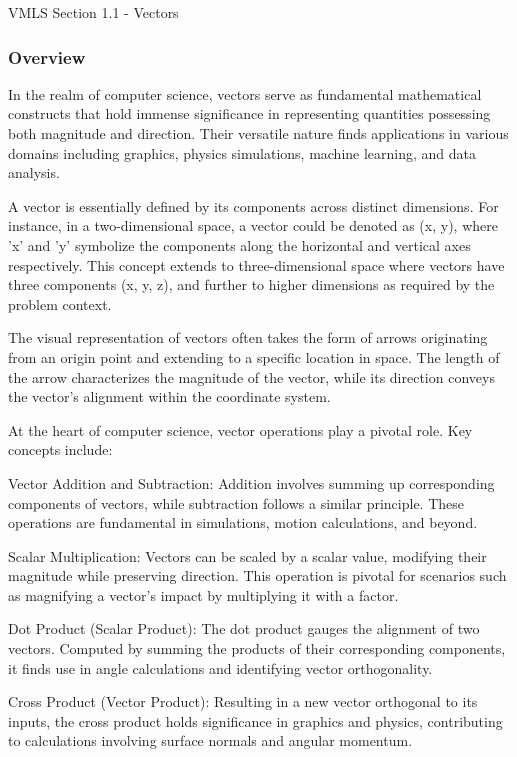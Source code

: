 \begin{notes}{VMLS Section 1.1 - Vectors}
    \subsubsection*{Overview}

    In the realm of computer science, vectors serve as fundamental mathematical constructs that hold immense significance in representing quantities possessing both magnitude and direction. Their 
    versatile nature finds applications in various domains including graphics, physics simulations, machine learning, and data analysis.

    A vector is essentially defined by its components across distinct dimensions. For instance, in a two-dimensional space, a vector could be denoted as (x, y), where 'x' and 'y' symbolize the 
    components along the horizontal and vertical axes respectively. This concept extends to three-dimensional space where vectors have three components (x, y, z), and further to higher dimensions 
    as required by the problem context.

    The visual representation of vectors often takes the form of arrows originating from an origin point and extending to a specific location in space. The length of the arrow characterizes the 
    magnitude of the vector, while its direction conveys the vector's alignment within the coordinate system.

    At the heart of computer science, vector operations play a pivotal role. Key concepts include:

    Vector Addition and Subtraction: Addition involves summing up corresponding components of vectors, while subtraction follows a similar principle. These operations are fundamental in simulations, 
    motion calculations, and beyond.

    Scalar Multiplication: Vectors can be scaled by a scalar value, modifying their magnitude while preserving direction. This operation is pivotal for scenarios such as magnifying a vector's impact 
    by multiplying it with a factor.

    Dot Product (Scalar Product): The dot product gauges the alignment of two vectors. Computed by summing the products of their corresponding components, it finds use in angle calculations and 
    identifying vector orthogonality.

    Cross Product (Vector Product): Resulting in a new vector orthogonal to its inputs, the cross product holds significance in graphics and physics, contributing to calculations involving surface 
    normals and angular momentum.


\end{notes}
